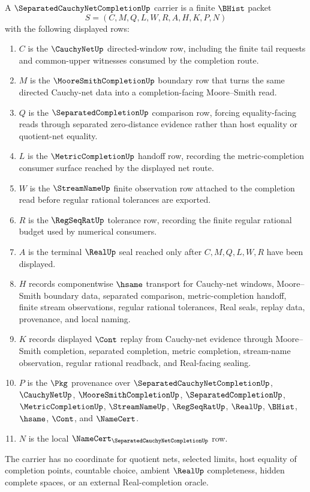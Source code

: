 \begin{definition}
\label{def:separated-cauchy-net-completion-carrier}
A $\SeparatedCauchyNetCompletionUp$ carrier is a finite $\BHist$ packet
$$
S=(C,M,Q,L,W,R,A,H,K,P,N)
$$
with the following displayed rows:
\begin{enumerate}
\item $C$ is the $\CauchyNetUp$ directed-window row, including the finite tail requests and common-upper witnesses consumed by the completion route.
\item $M$ is the $\MooreSmithCompletionUp$ boundary row that turns the same directed Cauchy-net data into a completion-facing Moore--Smith read.
\item $Q$ is the $\SeparatedCompletionUp$ comparison row, forcing equality-facing reads through separated zero-distance evidence rather than host equality or quotient-net equality.
\item $L$ is the $\MetricCompletionUp$ handoff row, recording the metric-completion consumer surface reached by the displayed net route.
\item $W$ is the $\StreamNameUp$ finite observation row attached to the completion read before regular rational tolerances are exported.
\item $R$ is the $\RegSeqRatUp$ tolerance row, recording the finite regular rational budget used by numerical consumers.
\item $A$ is the terminal $\RealUp$ seal reached only after $C,M,Q,L,W,R$ have been displayed.
\item $H$ records componentwise $\hsame$ transport for Cauchy-net windows, Moore--Smith boundary data, separated comparison, metric-completion handoff, finite stream observations, regular rational tolerances, Real seals, replay data, provenance, and local naming.
\item $K$ records displayed $\Cont$ replay from Cauchy-net evidence through Moore--Smith completion, separated completion, metric completion, stream-name observation, regular rational readback, and Real-facing sealing.
\item $P$ is the $\Pkg$ provenance over $\SeparatedCauchyNetCompletionUp$, $\CauchyNetUp$, $\MooreSmithCompletionUp$, $\SeparatedCompletionUp$, $\MetricCompletionUp$, $\StreamNameUp$, $\RegSeqRatUp$, $\RealUp$, $\BHist$, $\hsame$, $\Cont$, and $\NameCert$.
\item $N$ is the local $\NameCert_{\SeparatedCauchyNetCompletionUp}$ row.
\end{enumerate}
The carrier has no coordinate for quotient nets, selected limits, host equality of completion points, countable choice, ambient $\RealUp$ completeness, hidden complete spaces, or an external Real-completion oracle.
\end{definition}

